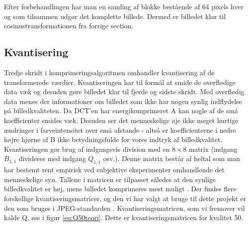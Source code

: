 Efter forbehandlingen har man en samling af blokke bestående af 64 pixels hver og som tilsammen udgør det komplette billede. Dermed er billedet klar til cosinustransformationen fra forrige section.

\subsection{Kvantisering}
Tredje skridt i komprimeringsalgoritmen omhandler kvantisering af de transformerede værdier. Kvantiseringen har til formål at smide de overflødige data væk og desuden gøre billedet klar til fjerde og sidste skridt. Med overflødig data menes der informationer om billedet som ikke har nogen synlig indflydelse på billedkvaliteten. Da DCT'en har energikomprimeret A kan nogle af de små koefficienter smides væk. Desuden ser det menneskelige øje ikke meget hurtige ændringer i farveintensitet over små afstande - altså er koefficienterne i nedre højre hjørne af B ikke betydningsfulde for vores indtryk af billedkvalitet.\\
Kvantiseringen gør brug af indgangsvis division med en $8\times8$ matrix (indgang $B_{1,1}$ divideres med indgang $Q_{1,1}$ osv.). Denne matrix består af heltal som man har bestemt rent empirisk ved subjektive eksperimenter omhandlende det menneskelige syn. Tallene i matricen er tilpasset således at den synlige billedkvalitet er høj, mens billedet komprimeres mest muligt \citep{lokminglui}. Der findes flere forskellige kvantiseringsmatricer, og den vi har valgt at bruge til dette projekt er den som bruges i JPEG-standarden \citep{lokminglui}. Kvantiseringsmatricen, som vi fremover vil kalde Q, ses i figur \vref{eq:Q50teori}. Dette er kvantiseringsmatricen for kvalitet 50.

